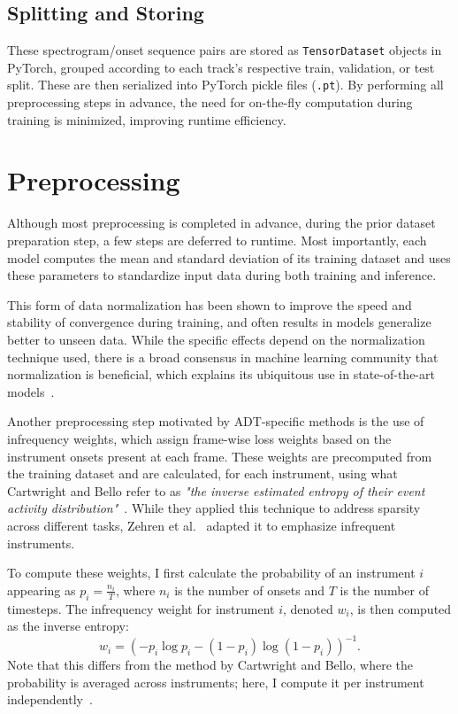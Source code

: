 \subsection{Splitting and Storing}

These spectrogram/onset sequence pairs are stored as \texttt{TensorDataset} objects in PyTorch, grouped according to each track's respective train, validation, or test split. These are then serialized into PyTorch pickle files (\texttt{.pt}). By performing all preprocessing steps in advance, the need for on-the-fly computation during training is minimized, improving runtime efficiency.

\section{Preprocessing}

Although most preprocessing is completed in advance, during the prior dataset preparation step, a few steps are deferred to runtime. Most importantly, each model computes the mean and standard deviation of its training dataset and uses these parameters to standardize input data during both training and inference. 

This form of data normalization has been shown to improve the speed and stability of convergence during training, and often results in models generalize better to unseen data. While the specific effects depend on the normalization technique used, there is a broad consensus in machine learning community that normalization is beneficial, which explains its ubiquitous use in state-of-the-art models~\cite{10056354}.

Another preprocessing step motivated by \gls{ADT}-specific methods is the use of infrequency weights, which assign frame-wise loss weights based on the instrument onsets present at each frame. These weights are precomputed from the training dataset and are calculated, for each instrument, using what Cartwright and Bello refer to as \textit{"the inverse estimated entropy of their event activity distribution"}~\cite{cartwright2018increasing}. While they applied this technique to address sparsity across different tasks, Zehren et al.~\cite{signals4040042} adapted it to emphasize infrequent instruments.

To compute these weights, I first calculate the probability of an instrument $i$ appearing as $p_i = \frac{n_i}{T}$, where $n_i$ is the number of onsets and $T$ is the number of timesteps. The infrequency weight for instrument $i$, denoted $w_i$, is then computed as the inverse entropy: \[w_i = \left(-p_i\log p_i - (1 - p_i)\log{(1 - p_i)}\right)^{-1}.\] Note that this differs from the method by Cartwright and Bello, where the probability is averaged across instruments; here, I compute it per instrument independently~\cite{cartwright2018increasing}. 

